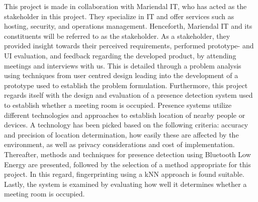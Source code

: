 This project is made in collaboration with Mariendal IT, who has acted as the stakeholder in this project.
They specialize in IT and offer services such as hosting, security, and operations management\cite{Mariendal_OmOs}.
Henceforth, Mariendal IT and its constituents will be referred to as the stakeholder. 
As a stakeholder, they provided insight towards their perceived requirements, performed prototype- and UI evaluation, and feedback regarding the developed product, by attending meetings and interviews with us.
This is detailed through a problem analysis using techniques from user centred design leading into the development of a prototype used to establish the problem formulation. 
Furthermore, this project regards itself with the design and evaluation of a presence detection system used to establish whether a meeting room is occupied.
Presence systems utilize different technologies and approaches to establish location of nearby people or devices.
A technology has been picked based on the following criteria: accuracy and precision of location determination, how easily these are affected by the environment, as well as privacy considerations and cost of implementation.
Thereafter, methods and techniques for presence detection using Bluetooth Low Energy are presented, followed by the selection of a method appropriate for this project. 
In this regard, fingerprinting using a kNN approach is found suitable.  
Lastly, the system is examined by evaluating how well it determines whether a meeting room is occupied.



